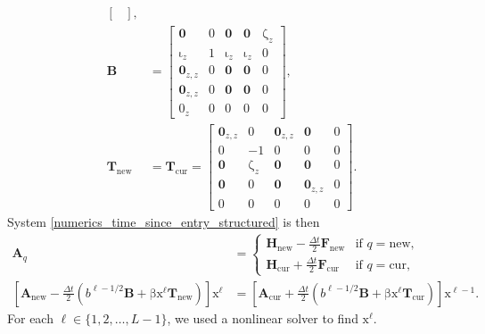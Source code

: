 \documentclass[USenglish]{article}
\renewcommand{\vec}[1]{\boldsymbol{\mathrm{#1}}}
\newcommand{\mat}[1]{\mathbf{#1}}
\begin{document}
\begin{subequations}
\begin{align}
\begin{bmatrix}
    \end{bmatrix},
    \\
    \mat{B} &=
    \begin{bmatrix}
      \mat{0} & \vec{0} & \mat{0} & \mat{0} & \vec{\zeta}_z
      \\
      \vec{\iota}_z & 1 & \vec{\iota}_z & \vec{\iota}_z & 0
      \\
      \mat{0}_{z,z} & \vec{0} & \mat{0} & \mat{0} & \vec{0}
      \\
      \mat{0}_{z,z} & \vec{0} & \mat{0} & \mat{0} & \vec{0}
      \\
      \vec{0}_z & 0 & \vec{0} & \vec{0} & 0
    \end{bmatrix},
    \\
    \mat{T}_{\mathrm{new}} &=
    \mat{T}_{\mathrm{cur}} =
    \begin{bmatrix}
      \mat{0}_{z,z} & \vec{0} & \mat{0}_{z,z} & \mat{0} & \vec{0}
      \\
      \vec{0} & - 1 & \vec{0} & \vec{0} & 0
      \\
      \mat{0} & \vec{\zeta}_z & \mat{0} & \mat{0} & \vec{0}
      \\
      \mat{0} & \vec{0} & \mat{0} & \mat{0}_{z,z} & \vec{0}
      \\
      \vec{0} & 0 & \vec{0} & \vec{0} & 0
    \end{bmatrix}.
  \end{align}
\end{subequations}
System \eqref{numerics_time_since_entry_structured} is then
\begin{subequations}
  \label{step_time_since_entry_structured}
  \begin{align}
    \mat{A}_q &=
    \begin{cases}
      \mat{H}_{\mathrm{new}} - \frac{\Delta t}{2} \mat{F}_{\mathrm{new}}
      & \text{if $q = \mathrm{new}$},
      \\
      \mat{H}_{\mathrm{cur}} + \frac{\Delta t}{2} \mat{F}_{\mathrm{cur}}
      & \text{if $q = \mathrm{cur}$},
    \end{cases}
    \\
    \left[
      \mat{A}_{\mathrm{new}}
      - \frac{\Delta t}{2} \left(
        b^{\ell - 1 / 2} \mat{B}
        + \vec{\beta} \vec{x}^{\ell} \mat{T}_{\mathrm{new}}
      \right)
    \right]
    \vec{x}^{\ell} &=
    \left[
      \mat{A}_{\mathrm{cur}}
      + \frac{\Delta t}{2} \left(
        b^{\ell - 1 / 2} \mat{B}
        + \vec{\beta} \vec{x}^{\ell} \mat{T}_{\mathrm{cur}}
      \right)
    \right]
    \vec{x}^{\ell - 1}.
  \end{align}
\end{subequations}
For each $\ell \in \{1, 2, \ldots, L - 1\}$, we used a nonlinear
solver to find $\vec{x}^{\ell}$.
\end{document}
